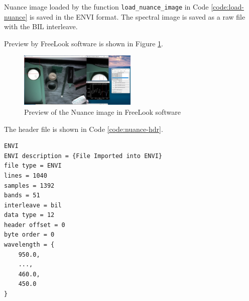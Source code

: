Nuance image loaded by the function \texttt{load\_nuance\_image} in
Code \ref{code:load-nuance} is saved in the ENVI format.
The spectral image is saved as a raw file with the BIL interleave.

Preview by FreeLook software is shown in Figure \ref{fig:nuance-preview}.

\begin{figure}[H]
  \centering
  \caption{Preview of the Nuance image in FreeLook software}
  \label{fig:nuance-preview}
  \includegraphics[width=0.5\textwidth]{./fig-task2/nuance.jpg}
\end{figure}

The header file is shown in Code \ref{code:nuance-hdr}.

\begin{lstlisting}[caption=Saved ENVI header file, label={code:nuance-hdr}]
ENVI
ENVI description = {File Imported into ENVI}
file type = ENVI
lines = 1040
samples = 1392
bands = 51
interleave = bil
data type = 12
header offset = 0
byte order = 0
wavelength = {
    950.0,
    ...,
    460.0,
    450.0
}

\end{lstlisting}
